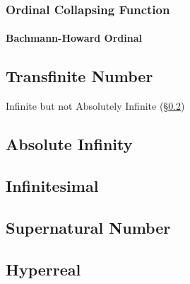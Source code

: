 \subsubsection{Ordinal Collapsing Function}
\label{sec:ordinal_collapsing}

\paragraph{Bachmann-Howard Ordinal}\label{sec:bachmann_howard}



\subsection{Transfinite Number}\label{sec:transfinite_number}

Infinite but not Absolutely Infinite (\S\ref{sec:absolute_infinity})



\subsection{Absolute Infinity}\label{sec:absolute_infinity}

\subsection{Infinitesimal}\label{sec:infinitesimal}

\subsection{Supernatural Number}\label{sec:supernatural_number}

\subsection{Hyperreal}\label{sec:hyperreal}


